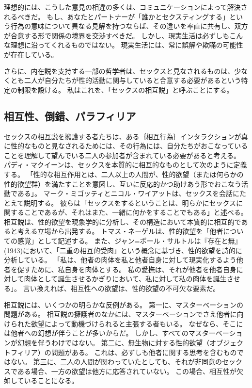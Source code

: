 \documentclass[paper=a4,book,openany]{jlreq}
\begin{document}
理想的には、こうした意見の相違の多くは、コミュニケーションによって解決されるべきだ。
もし、あなたとパートナーが「誰かとセクスティングする」という行為の意味について異なる見解を持つならば、その違いを率直に共有し、双方が合意する形で関係の境界を交渉すべきだ。
しかし、現実生活は必ずしもこんな理想に沿ってくれるものではない。
現実生活には、常に誤解や欺瞞の可能性が存在している。

さらに、内在説を支持する一部の哲学者は、セックスと見なされるものは、少なくとも二人が自分たちが性的活動に関与していると合意する必要があるという特定の制限を設ける。
私はこれを、「セックスの相互説」と呼ぶことにする。

\subsection{相互性、倒錯、パラフィリア}

セックスの相互説を擁護する者たちは、ある｛相互行為｝{インタラクション}が真に性的なものと見なされるためには、その行為には、自分たちがおこなっていることを理解して望んでいる二人の参加者が含まれている必要があると考える。
パディ・マクイーンは、セックスを本質的に相互的なものとして次のように定義する。
「性的な相互作用とは、二人以上の人間が、性的欲望（または何らかの性的欲望群）を満たすことを意図し、互いに反応的かつ助けあう形でおこなう活動である」\citep{mcqueen21:_sexual_inter_sexual_infid}。
マーク・ミゴッティとニコル・ワイアットは、セックスを会話にたとえて説明する。
彼らは「セックスをするということは、明らかにセックスに関することであるが、それはまた、一緒に何かをすることでもある」と述べる\citep[p.19]{migotti17:_very_idea_sex_robot}。
相互説は、性的欲望を現象学的に分析し、その構造において本質的に相互的であると考える立場から出発する。
トマス・ネーゲルは、性的欲望を「他者についての感覚」として記述する\citep[p.8]{nagel69:_sexual_perver}。
また、ジャン=ポール・サルトルは『存在と無』(1943)において、「二重の相互的受肉」という概念に基づき、性的欲望を詩的に分析している。
「私は、他者の肉体を私と他者自身に対して現実化するよう他者を促すために、私自身を肉体とする。
私の愛撫は、それが他者を他者自身に対して肉体として誕生させるかぎりにおいて、私に対して私の肉体を誕生させる」\citep[p.514]{sartre43:_being_nothin}。
言い換えれば、相互性への欲望は、性的欲望の不可欠な要素だ。

相互説には、いくつかの明らかな反例がある。
第一に、マスターベーションの問題がある。
相互説の擁護者のなかには、マスターベーションでさえ他者に向けられた欲望によって動機づけられると主張する者もいる。
なぜなら、そこには他者への幻想が伴うことが多いからだ。
しかし、すべてのマスターベーションが幻想を伴うわけではない。
第二に、無生物に対する性的欲望（オブジェクトフィリア）の問題がある。
これは、必ずしも他者に関する思考を含むものではない。
第三に、二人の人間が関わっていたとしても、それが非同意のセックスである場合、一方の欲望は他方に応答されていない。
この場合、相互性が欠如していることになる。
\end{document}
